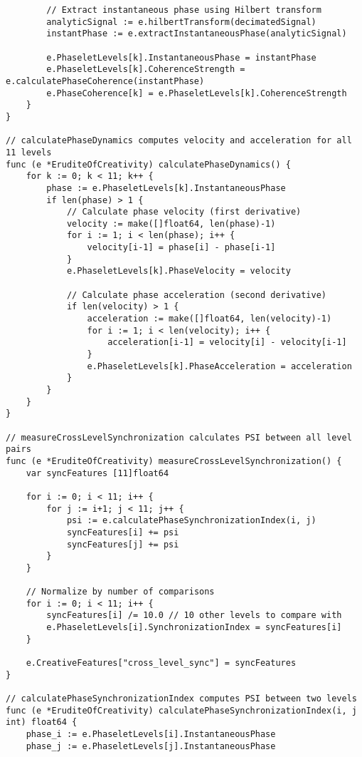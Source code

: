 \begin{tcolorbox}[colback=CodeBackground, colframe=DarkGray, title=Erudite of Creativity Implementation, fonttitle=\bfseries]
\begin{verbatim}
        // Extract instantaneous phase using Hilbert transform
        analyticSignal := e.hilbertTransform(decimatedSignal)
        instantPhase := e.extractInstantaneousPhase(analyticSignal)
        
        e.PhaseletLevels[k].InstantaneousPhase = instantPhase
        e.PhaseletLevels[k].CoherenceStrength = e.calculatePhaseCoherence(instantPhase)
        e.PhaseCoherence[k] = e.PhaseletLevels[k].CoherenceStrength
    }
}

// calculatePhaseDynamics computes velocity and acceleration for all 11 levels
func (e *EruditeOfCreativity) calculatePhaseDynamics() {
    for k := 0; k < 11; k++ {
        phase := e.PhaseletLevels[k].InstantaneousPhase
        if len(phase) > 1 {
            // Calculate phase velocity (first derivative)
            velocity := make([]float64, len(phase)-1)
            for i := 1; i < len(phase); i++ {
                velocity[i-1] = phase[i] - phase[i-1]
            }
            e.PhaseletLevels[k].PhaseVelocity = velocity
            
            // Calculate phase acceleration (second derivative)
            if len(velocity) > 1 {
                acceleration := make([]float64, len(velocity)-1)
                for i := 1; i < len(velocity); i++ {
                    acceleration[i-1] = velocity[i] - velocity[i-1]
                }
                e.PhaseletLevels[k].PhaseAcceleration = acceleration
            }
        }
    }
}

// measureCrossLevelSynchronization calculates PSI between all level pairs
func (e *EruditeOfCreativity) measureCrossLevelSynchronization() {
    var syncFeatures [11]float64
    
    for i := 0; i < 11; i++ {
        for j := i+1; j < 11; j++ {
            psi := e.calculatePhaseSynchronizationIndex(i, j)
            syncFeatures[i] += psi
            syncFeatures[j] += psi
        }
    }
    
    // Normalize by number of comparisons
    for i := 0; i < 11; i++ {
        syncFeatures[i] /= 10.0 // 10 other levels to compare with
        e.PhaseletLevels[i].SynchronizationIndex = syncFeatures[i]
    }
    
    e.CreativeFeatures["cross_level_sync"] = syncFeatures
}

// calculatePhaseSynchronizationIndex computes PSI between two levels
func (e *EruditeOfCreativity) calculatePhaseSynchronizationIndex(i, j int) float64 {
    phase_i := e.PhaseletLevels[i].InstantaneousPhase
    phase_j := e.PhaseletLevels[j].InstantaneousPhase
    

\end{verbatim}
\end{tcolorbox}
